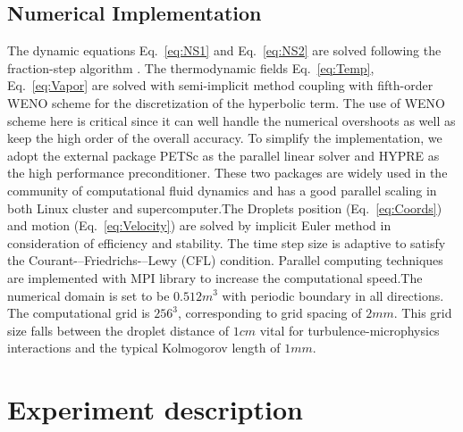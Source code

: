 \documentclass[draft,jgrga]{AGUTeX}
\newcommand{\Eq}[1]{Eq.~\eqref{#1}} \newcommand{\Fig}[1]{Figure~\ref{#1}}
\begin{document}
\begin{article}
\subsection{Numerical Implementation}
The dynamic equations \Eq{eq:NS1} and \Eq{eq:NS2} are solved following the fraction-step algorithm \cite{Brown2001}. The thermodynamic fields \Eq{eq:Temp}, \Eq{eq:Vapor} are solved with semi-implicit method coupling with fifth-order WENO scheme for the discretization of the hyperbolic term. The use of WENO scheme here is critical since it can well handle the numerical overshoots as well as keep the high order of the overall accuracy. To simplify the implementation, we adopt the external package PETSc \cite{petsc_cite} as the parallel linear solver and HYPRE \cite{hypre_cite} as the high performance preconditioner. These two packages are widely used in the community of computational fluid dynamics and has a good parallel scaling in both Linux cluster and supercomputer.The Droplets position (\Eq{eq:Coords}) and motion (\Eq{eq:Velocity}) are solved by implicit Euler method in consideration of efficiency and stability. The time step size is adaptive to satisfy the Courant-–Friedrichs-–Lewy (CFL) condition. Parallel computing techniques are implemented with MPI library to increase the computational speed.The numerical domain is set to be $0.512m^{3}$ with periodic boundary in all directions. The computational grid is $256^{3}$, corresponding to grid spacing of $2mm$. This grid size falls between the droplet distance of $1cm$ vital for turbulence-microphysics interactions and the typical Kolmogorov length of $1mm$.

\section{Experiment description}\label{experiment_description}


\end{article}
\end{document}
